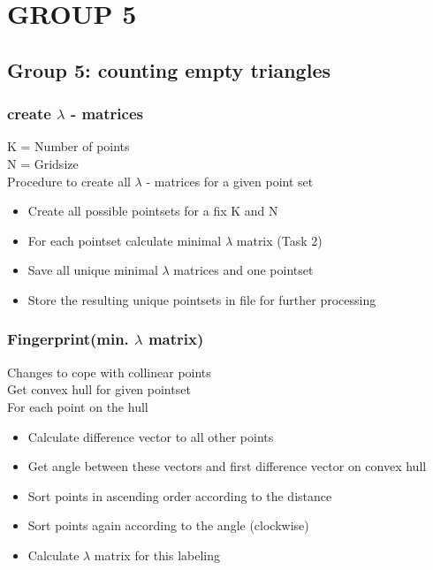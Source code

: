 
\section{GROUP 5}
\subsection{Group 5: counting empty triangles}
\begin{frame}
\frametitle{create $\lambda$ - matrices}
K = Number of points \\
N = Gridsize \\
Procedure to create all $\lambda$ - matrices for a given point set \\
\begin{itemize}
  \item Create all possible pointsets for a fix K and N
  \item For each pointset calculate minimal $\lambda$ matrix (Task 2)
  \item Save all unique minimal $\lambda$ matrices and one pointset
  \item Store the resulting unique pointsets in file for further processing
\end{itemize}
\end{frame}

\begin{frame}
\frametitle{Fingerprint(min. $\lambda$ matrix)}
Changes to cope with collinear points \\
Get convex hull for given pointset \\
For each point on the hull
\begin{itemize}
  \item Calculate difference vector to all other points
  \item Get angle between these vectors and first difference vector on convex hull
  \item Sort points in ascending order according to the distance
  \item Sort points again according to the angle (clockwise)
  \item Calculate $\lambda$ matrix for this labeling
\end{itemize}
\end{frame}

